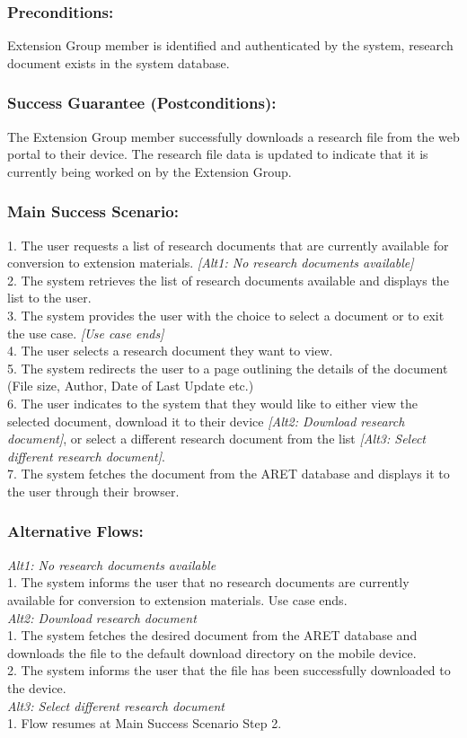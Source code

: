 \documentclass[12pt,letterpaper]{article}
\begin{document}
\subsubsection*{Preconditions:}
Extension Group member is identified and authenticated by the system, research document exists in the system database.

\subsubsection*{Success Guarantee (Postconditions):}
The Extension Group member successfully downloads a research file from the web portal to their device. The research file data is updated to indicate that it is currently being worked on by the Extension Group.

\subsubsection*{Main Success Scenario:}
1. The user requests a list of research documents that are currently available for conversion to extension materials. \emph{[Alt1: No research documents available]}\\
2. The system retrieves the list of research documents available and displays the list to the user.\\
3. The system provides the user with the choice to select a document or to exit the use case. \emph{[Use case ends]}\\
4. The user selects a research document they want to view.\\
5. The system redirects the user to a page outlining the details of the document (File size, Author, Date of Last Update etc.) \\
6. The user indicates to the system that they would like to either view the selected document, download it to their device \emph{[Alt2: Download research document]}, or select a different research document from the list \emph{[Alt3: Select different research document]}.\\ 
7. The system fetches the document from the ARET database and displays it to the user through their browser.

\subsubsection*{Alternative Flows:}
\emph{Alt1: No research documents available}\\
1. The system informs the user that no research documents are currently available for conversion to extension materials. Use case ends.\\[10pt]
\emph{Alt2: Download research document}\\
1. The system fetches the desired document from the ARET database and downloads the file to the default download directory on the mobile device. \\
2. The system informs the user that the file has been successfully downloaded to the device. \\[10pt]
\emph{Alt3: Select different research document}\\
1. Flow resumes at Main Success Scenario Step 2.
\end{document}
